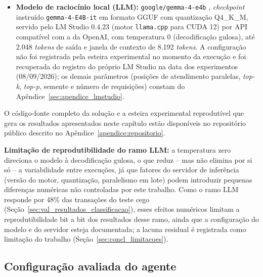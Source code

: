 \begin{itemize}
	\item \textbf{Modelo de raciocínio local (LLM):} \texttt{google/gemma-4-e4b} \cite{gemmateam2026gemma4}, \textit{checkpoint} instruído \texttt{gemma-4-E4B-it} em formato GGUF com quantização Q4\_K\_M, servido pelo LM Studio 0.4.23 (motor \texttt{llama.cpp} para CUDA 12) por API compatível com a da OpenAI, com temperatura 0 (decodificação gulosa), até 2.048 \textit{tokens} de saída e janela de contexto de 8.192 \textit{tokens}. A configuração não foi registrada pela esteira experimental no momento da execução e foi recuperada do registro do próprio LM Studio na data dos experimentos (08/09/2026); os demais parâmetros (posições de atendimento paralelas, \textit{top-k}, \textit{top-p}, semente e número de requisições) constam do Apêndice~\ref{sec:apendice_lmstudio}.
\end{itemize}

O código-fonte completo da solução e a esteira experimental reprodutível que gera os resultados apresentados neste capítulo estão disponíveis no repositório público descrito no Apêndice~\ref{apendice:repositorio}.

\textbf{Limitação de reprodutibilidade do ramo LLM:} a temperatura zero direciona o modelo à decodificação gulosa, o que reduz -- mas não elimina por si só -- a variabilidade entre execuções, já que fatores do servidor de inferência (versão do motor, quantização, paralelismo em lote) podem introduzir pequenas diferenças numéricas não controladas por este trabalho. Como o ramo LLM responde por 48\% das transações do teste cego (Seção~\ref{sec:val_resultados_classificacao}), esses efeitos numéricos limitam a reprodutibilidade bit a bit dos resultados desse ramo, ainda que a configuração do modelo e do servidor esteja documentada; a lacuna residual é registrada como limitação do trabalho (Seção~\ref{sec:concl_limitacoes}).

\subsection{Configuração avaliada do agente}
\label{sec:val_config_agente}

